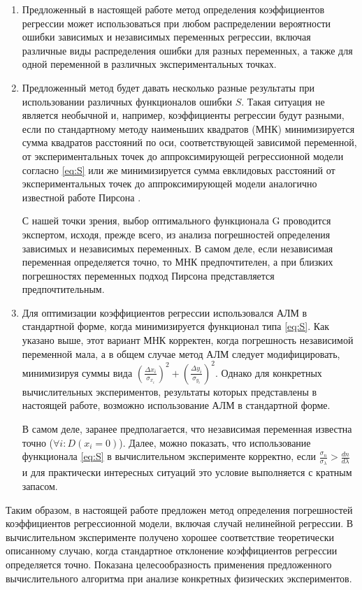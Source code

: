 \documentclass[11pt,a4paper]{article}
\theoremstyle{definition}
\begin{document}
\begin{enumerate}
  \item Предложенный в настоящей работе метод определения коэффициентов
    регрессии может использоваться при любом распределении
    вероятности ошибки зависимых и независимых переменных регрессии,
    включая различные виды распределения ошибки для разных переменных, а
    также для одной переменной в различных экспериментальных точках.
  \item Предложенный метод будет давать несколько разные результаты при
    использовании различных функционалов ошибки $S$. Такая ситуация
    не является необычной и, например, коэффициенты регрессии будут разными,
    если по стандартному методу наименьших квадратов (МНК) минимизируется
    сумма квадратов расстояний по оси, соответствующей зависимой переменной, от экспериментальных точек до
	аппроксимирующей регрессионной модели согласно \eqref{eq:S} или же минимизируется сумма
    евклидовых расстояний от экспериментальных точек до аппроксимирующей
	модели аналогично известной работе Пирсона \cite{pearson1901}.

	С нашей точки зрения, выбор оптимального функционала G
	проводится экспертом, исходя, прежде всего, из анализа погрешностей
	определения зависимых и независимых переменных. В самом деле, если
	независимая переменная определяется точно, то МНК предпочтителен, а при
	близких погрешностях переменных подход Пирсона представляется
	предпочтительным.
  \item Для оптимизации коэффициентов регрессии использовался
	АЛМ в стандартной форме, когда минимизируется функционал типа \eqref{eq:S}. Как
	указано выше, этот вариант МНК корректен, когда погрешность независимой
	переменной мала, а в общем случае метод АЛМ следует модифицировать,
	минимизируя суммы вида $(\frac{\Delta x_i}{\sigma_{x_i}})^2 + (\frac{\Delta y_i}{\sigma_{y_i}})^2$. Однако для конкретных
	вычислительных экспериментов, результаты которых представлены в
	настоящей работе, возможно использование АЛМ в стандартной форме.

	В самом деле, заранее предполагается, что независимая
	переменная известна точно ($\forall i : D(x_i = 0)$). Далее, можно показать, что
	использование функционала \eqref{eq:S} в вычислительном эксперименте
	корректно, если $\frac{\sigma_n}{\sigma_{\lambda}} > \frac{dn}{d\lambda}$ и для практически интересных ситуаций это
	условие выполняется с кратным запасом.
\end{enumerate}

Таким образом, в настоящей работе предложен метод определения
погрешностей коэффициентов регрессионной модели, включая случай нелинейной регрессии. В
вычислительном эксперименте получено хорошее соответствие теоретически описанному случаю, когда
стандартное отклонение коэффициентов регрессии определяется точно.
Показана целесообразность применения предложенного вычислительного
алгоритма при анализе конкретных физических экспериментов.

\FloatBarrier


%
%

\end{document}
